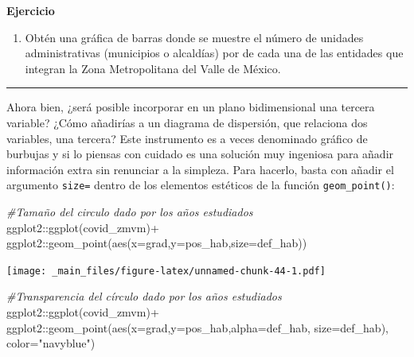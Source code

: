 \documentclass[
  11pt,
  oneside]{book}
\newenvironment{Shaded}{\begin{snugshade}}{\end{snugshade}}
\newcommand{\AttributeTok}[1]{\textcolor[rgb]{0.77,0.63,0.00}{#1}}
\newcommand{\CommentTok}[1]{\textcolor[rgb]{0.56,0.35,0.01}{\textit{#1}}}
\newcommand{\FunctionTok}[1]{\textcolor[rgb]{0.00,0.00,0.00}{#1}}
\newcommand{\NormalTok}[1]{#1}
\newcommand{\SpecialCharTok}[1]{\textcolor[rgb]{0.00,0.00,0.00}{#1}}
\newcommand{\StringTok}[1]{\textcolor[rgb]{0.31,0.60,0.02}{#1}}
\providecommand{\tightlist}{%
  \setlength{\itemsep}{0pt}\setlength{\parskip}{0pt}}
\begin{document}
\textbf{Ejercicio}

\begin{enumerate}
\def\labelenumi{\roman{enumi}.}
\tightlist
\item
  Obtén una gráfica de barras donde se muestre el número de unidades administrativas (municipios o alcaldías) por de cada una de las entidades que integran la Zona Metropolitana del Valle de México.
\end{enumerate}

\begin{center}\rule{0.5\linewidth}{0.5pt}\end{center}

Ahora bien, ¿será posible incorporar en un plano bidimensional una tercera variable? ¿Cómo añadirías a un diagrama de dispersión, que relaciona dos variables, una tercera? Este instrumento es a veces denominado gráfico de burbujas y si lo piensas con cuidado es una solución muy ingeniosa para añadir información extra sin renunciar a la simpleza. Para hacerlo, basta con añadir el argumento \texttt{size=} dentro de los elementos estéticos de la función \texttt{geom\_point()}:

\begin{Shaded}
\begin{Highlighting}[]
\CommentTok{\#Tamaño del circulo dado por los años estudiados}
\NormalTok{ggplot2}\SpecialCharTok{::}\FunctionTok{ggplot}\NormalTok{(covid\_zmvm)}\SpecialCharTok{+}
\NormalTok{  ggplot2}\SpecialCharTok{::}\FunctionTok{geom\_point}\NormalTok{(}\FunctionTok{aes}\NormalTok{(}\AttributeTok{x=}\NormalTok{grad,}\AttributeTok{y=}\NormalTok{pos\_hab,}\AttributeTok{size=}\NormalTok{def\_hab))}
\end{Highlighting}
\end{Shaded}

\texttt{[image: \_main\_files/figure-latex/unnamed-chunk-44-1.pdf]}

\begin{Shaded}
\begin{Highlighting}[]
\CommentTok{\#Transparencia del círculo dado por los años estudiados}
\NormalTok{ggplot2}\SpecialCharTok{::}\FunctionTok{ggplot}\NormalTok{(covid\_zmvm)}\SpecialCharTok{+}
\NormalTok{  ggplot2}\SpecialCharTok{::}\FunctionTok{geom\_point}\NormalTok{(}\FunctionTok{aes}\NormalTok{(}\AttributeTok{x=}\NormalTok{grad,}\AttributeTok{y=}\NormalTok{pos\_hab,}\AttributeTok{alpha=}\NormalTok{def\_hab, }\AttributeTok{size=}\NormalTok{def\_hab), }\AttributeTok{color=}\StringTok{"navyblue"}\NormalTok{)}
\end{Highlighting}
\end{Shaded}
\end{document}
